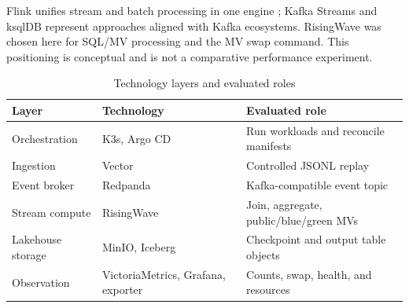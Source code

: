 Flink unifies stream and batch processing in one engine \parencite{carbone2015flink}; Kafka Streams and ksqlDB represent approaches aligned with Kafka ecosystems. RisingWave was chosen here for SQL/MV processing and the MV swap command. This positioning is conceptual and is not a comparative performance experiment.

\begin{table}[t!]
\centering
\caption{Technology layers and evaluated roles}
\label{tab:tech-en}
\begin{tabularx}{\textwidth}{@{}p{}p{}Y@{}}
\toprule
\textbf{Layer} & \textbf{Technology} & \textbf{Evaluated role}\\
\midrule
Orchestration & K3s, Argo CD & Run workloads and reconcile manifests\\
Ingestion & Vector & Controlled JSONL replay\\
Event broker & Redpanda & Kafka-compatible event topic\\
Stream compute & RisingWave & Join, aggregate, public/blue/green MVs\\
Lakehouse storage & MinIO, Iceberg & Checkpoint and output table objects\\
Observation & VictoriaMetrics, Grafana, exporter & Counts, swap, health, and resources\\
\bottomrule
\end{tabularx}
\end{table}
